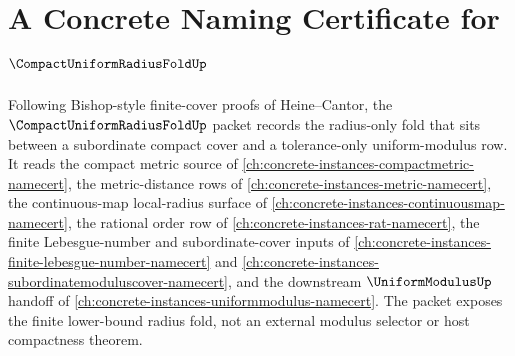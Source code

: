 \chapter{A Concrete Naming Certificate for $\CompactUniformRadiusFoldUp$}
\label{ch:concrete-instances-compact-uniform-radius-fold-namecert}

Following Bishop-style finite-cover proofs of Heine--Cantor, the $\CompactUniformRadiusFoldUp$ packet records the radius-only fold that sits between a subordinate compact cover and a tolerance-only uniform-modulus row. It reads the compact metric source of \autoref{ch:concrete-instances-compactmetric-namecert}, the metric-distance rows of \autoref{ch:concrete-instances-metric-namecert}, the continuous-map local-radius surface of \autoref{ch:concrete-instances-continuousmap-namecert}, the rational order row of \autoref{ch:concrete-instances-rat-namecert}, the finite Lebesgue-number and subordinate-cover inputs of \autoref{ch:concrete-instances-finite-lebesgue-number-namecert} and \autoref{ch:concrete-instances-subordinatemoduluscover-namecert}, and the downstream $\UniformModulusUp$ handoff of \autoref{ch:concrete-instances-uniformmodulus-namecert}. The packet exposes the finite lower-bound radius fold, not an external modulus selector or host compactness theorem.

